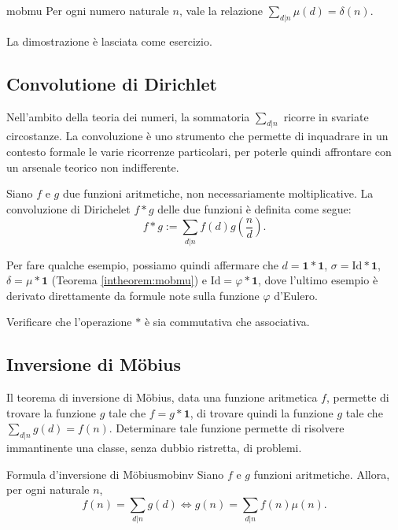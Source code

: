 \documentclass{article}
\begin{document}
\begin{intheorem}{}{mobmu}
	Per ogni numero naturale $n$, vale la relazione $\sum_{d\vert n}\mu(d)=\delta(n)$.
\end{intheorem}

La dimostrazione è lasciata come esercizio.


\subsection{Convolutione di Dirichlet}
Nell'ambito della teoria dei numeri, la sommatoria $\sum_{d\vert n}$
ricorre in svariate circostanze. La convoluzione è uno strumento
che permette di inquadrare in un contesto formale le varie ricorrenze
particolari, per poterle quindi affrontare con un arsenale teorico
non indifferente.

\begin{definition}
Siano $f$ e $g$ due funzioni aritmetiche, non necessariamente moltiplicative.
La convoluzione di Dirichelet $f\ast g$ delle due funzioni è definita come segue:
\begin{equation*}
	f\ast g:=\sum_{d\vert n}f(d)g\left(\frac{n}{d}\right).
\end{equation*}
\end{definition}

Per fare qualche esempio, possiamo quindi affermare che
$d=\textbf{1}\ast\textbf{1}$, $\sigma=\text{Id}\ast\textbf{1}$,
$\delta=\mu\ast\textbf{1}$ (Teorema \ref{intheorem:mobmu}) e
$\text{Id}=\varphi\ast\textbf{1}$, dove l'ultimo esempio è derivato
direttamente da formule note sulla funzione $\varphi$ d'Eulero.

\begin{exercise}
Verificare che l'operazione $\ast$ è sia commutativa che associativa.
\end{exercise}


\subsection{Inversione di Möbius}

Il teorema di inversione di Möbius, data una funzione aritmetica $f$, permette
di trovare la funzione $g$ tale che $f=g\ast\textbf{1}$, di trovare quindi
la funzione $g$ tale che $\sum_{d\vert n}g(d)=f(n)$. Determinare tale funzione
permette di risolvere immantinente una classe, senza dubbio ristretta, di problemi.

\begin{theorem}{Formula d'inversione di Möbius}{mobinv}
Siano $f$ e $g$ funzioni aritmetiche. Allora, per ogni naturale $n$,
\begin{equation*}
	f(n)=\sum_{d\vert n}g(d) \iff g(n)=\sum_{d\vert n}f(n)\mu(n).
\end{equation*}
\end{theorem}
\end{document}

